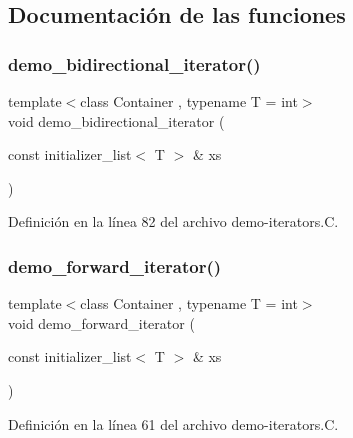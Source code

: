 \subsection{Documentación de las funciones}
\mbox{\label{demo-iterators_8_c_a26a099cedf4512aa8f05c2dd18e4b3d2}} 
\subsubsection{\texorpdfstring{demo\+\_\+bidirectional\+\_\+iterator()}{demo\_bidirectional\_iterator()}}
{\footnotesize\ttfamily template$<$class Container , typename T  = int$>$ \\
void demo\+\_\+bidirectional\+\_\+iterator (\begin{DoxyParamCaption}\item[{const initializer\+\_\+list$<$ T $>$ \&}]{xs }\end{DoxyParamCaption})}



Definición en la línea 82 del archivo demo-\/iterators.\+C.

\mbox{\label{demo-iterators_8_c_a971180b8ea13c61009c451fe7a942839}} 
\subsubsection{\texorpdfstring{demo\+\_\+forward\+\_\+iterator()}{demo\_forward\_iterator()}}
{\footnotesize\ttfamily template$<$class Container , typename T  = int$>$ \\
void demo\+\_\+forward\+\_\+iterator (\begin{DoxyParamCaption}\item[{const initializer\+\_\+list$<$ T $>$ \&}]{xs }\end{DoxyParamCaption})}



Definición en la línea 61 del archivo demo-\/iterators.\+C.

